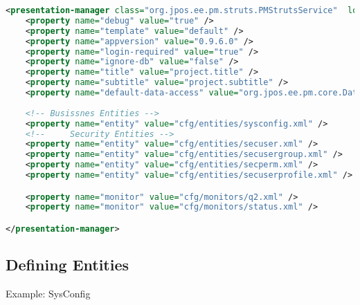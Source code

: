 \begin{lstlisting}[language=XML]
<presentation-manager class="org.jpos.ee.pm.struts.PMStrutsService"  logger="Q2">
    <property name="debug" value="true" /> 
    <property name="template" value="default" />
    <property name="appversion" value="0.9.6.0" />
    <property name="login-required" value="true" />
    <property name="ignore-db" value="false" />
    <property name="title" value="project.title" />
    <property name="subtitle" value="project.subtitle" />
    <property name="default-data-access" value="org.jpos.ee.pm.core.DataAccessDB"/>
    
    <!-- Busissnes Entities -->
    <property name="entity" value="cfg/entities/sysconfig.xml" />
    <!--     Security Entities -->
    <property name="entity" value="cfg/entities/secuser.xml" />
    <property name="entity" value="cfg/entities/secusergroup.xml" />
    <property name="entity" value="cfg/entities/secperm.xml" />
    <property name="entity" value="cfg/entities/secuserprofile.xml" />

    <property name="monitor" value="cfg/monitors/q2.xml" />
    <property name="monitor" value="cfg/monitors/status.xml" />

</presentation-manager>
\end{lstlisting}

\subsection{Defining Entities}

Example: SysConfig

